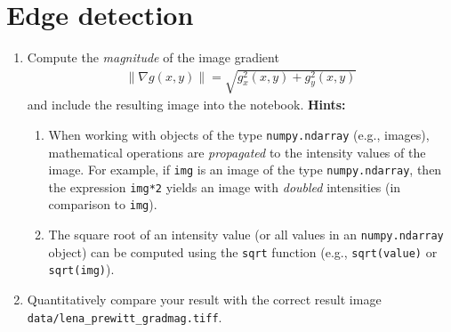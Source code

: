 \documentclass[12pt,a4paper]{article}
\begin{document}
\noindent\begin{minipage}{\textwidth}
\section{Edge detection}
\label{task:gradmag}
\begin{enumerate}
    \item Compute the \emph{magnitude} of the image gradient \begin{gather*}\left\|\nabla g\left(x,y\right)\right\| = \sqrt{g_x^2\left(x,y\right) + g_y^2\left(x,y\right)}\end{gather*} and include the resulting image into the notebook. \textbf{Hints:}
    \begin{enumerate}
        \item When working with objects of the type \texttt{numpy.ndarray} (e.g., images), mathematical operations are \emph{propagated} to the intensity values of the image. For example, if \texttt{img} is an image of the type \texttt{numpy.ndarray}, then the expression \texttt{img*2} yields an image with \emph{doubled} intensities (in comparison to \texttt{img}).
        \item The square root of an intensity value (or all values in an \texttt{numpy.ndarray} object) can be computed using the \texttt{sqrt} function (e.g., \texttt{sqrt(value)} or \texttt{sqrt(img)}).
    \end{enumerate}
    \item Quantitatively compare your result with the correct result image \texttt{data/\-lena\_\-prewitt\_\-gradmag.tiff}.
\end{enumerate}
\end{minipage}
\end{document}
